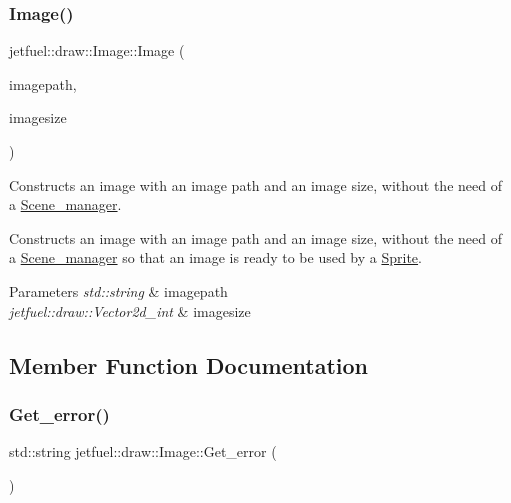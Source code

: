\subsubsection{\texorpdfstring{Image()}{Image()}\hspace{0.1cm}{\footnotesize\ttfamily [3/3]}}
{\footnotesize\ttfamily jetfuel\+::draw\+::\+Image\+::\+Image (\begin{DoxyParamCaption}\item[{const std\+::string}]{imagepath,  }\item[{const \hyperlink{classjetfuel_1_1draw_1_1Vector2d}{Vector2d\+\_\+int}}]{imagesize }\end{DoxyParamCaption})}



Constructs an image with an image path and an image size, without the need of a \hyperlink{classjetfuel_1_1draw_1_1Scene__manager}{Scene\+\_\+manager}. 

Constructs an image with an image path and an image size, without the need of a \hyperlink{classjetfuel_1_1draw_1_1Scene__manager}{Scene\+\_\+manager} so that an image is ready to be used by a \hyperlink{classjetfuel_1_1draw_1_1Sprite}{Sprite}.


\begin{DoxyParams}{Parameters}
{\em std\+::string} & imagepath \\
\hline
{\em jetfuel\+::draw\+::\+Vector2d\+\_\+int} & imagesize \\
\hline
\end{DoxyParams}


\subsection{Member Function Documentation}
\mbox{\label{classjetfuel_1_1draw_1_1Image_a4014f980cf67b0716b57b48f7a98020e}} 
\subsubsection{\texorpdfstring{Get\+\_\+error()}{Get\_error()}}
{\footnotesize\ttfamily std\+::string jetfuel\+::draw\+::\+Image\+::\+Get\+\_\+error (\begin{DoxyParamCaption}{ }\end{DoxyParamCaption})\hspace{0.3cm}{\ttfamily [inline]}}



